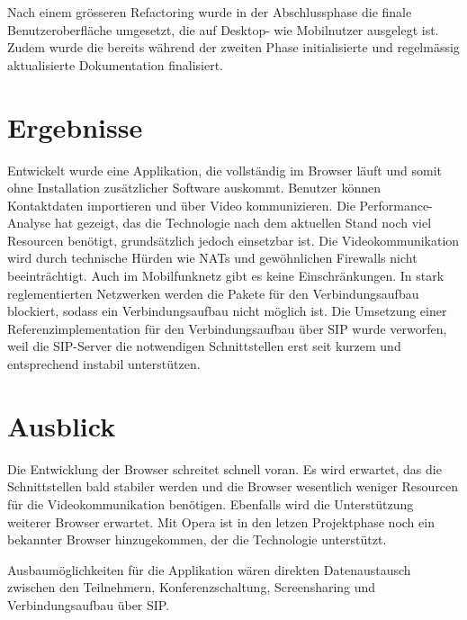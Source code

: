 Nach einem grösseren Refactoring wurde in der Abschlussphase die finale Benutzeroberfläche umgesetzt, die auf Desktop- wie Mobilnutzer ausgelegt ist.
Zudem wurde die bereits während der zweiten Phase initialisierte und regelmässig aktualisierte Dokumentation finalisiert.


\section{Ergebnisse}
Entwickelt wurde eine Applikation, die vollständig im Browser läuft und somit ohne Installation zusätzlicher Software auskommt.
Benutzer können Kontaktdaten importieren und über Video kommunizieren.
Die Performance-Analyse hat gezeigt, das die Technologie nach dem aktuellen Stand noch viel Resourcen benötigt, grundsätzlich jedoch einsetzbar ist.
Die Videokommunikation wird durch technische Hürden wie NATs und gewöhnlichen Firewalls nicht beeinträchtigt. Auch im Mobilfunknetz gibt es keine Einschränkungen.
In stark reglementierten Netzwerken werden die Pakete für den Verbindungsaufbau blockiert, sodass ein Verbindungsaufbau nicht möglich ist.
Die Umsetzung einer Referenzimplementation für den Verbindungsaufbau über SIP wurde verworfen, weil die SIP-Server die notwendigen Schnittstellen erst seit kurzem und entsprechend instabil unterstützen.


\section{Ausblick}
Die Entwicklung der Browser schreitet schnell voran. Es wird erwartet, das die Schnittstellen bald stabiler werden und die Browser wesentlich weniger Resourcen für die Videokommunikation benötigen. Ebenfalls wird die Unterstützung weiterer Browser erwartet. Mit Opera ist in den letzen Projektphase noch ein bekannter Browser hinzugekommen, der die Technologie unterstützt.

Ausbaumöglichkeiten für die Applikation wären direkten Datenaustausch zwischen den Teilnehmern, Konferenzschaltung, Screensharing und Verbindungsaufbau über SIP.
